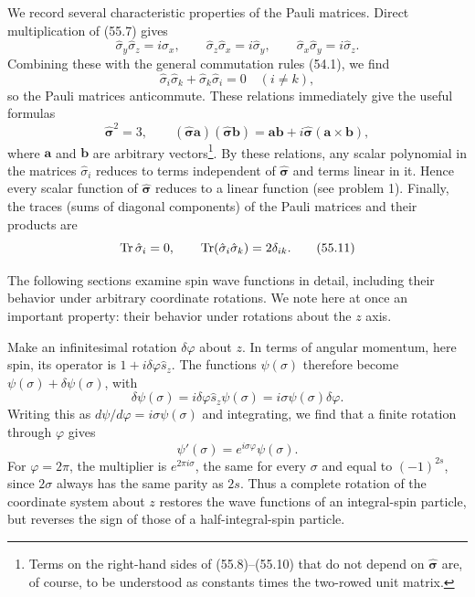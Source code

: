 We record several characteristic properties of the Pauli matrices. Direct
multiplication of (55.7) gives
\begin{equation}
 \hat\sigma_y\hat\sigma_z=i\hat\sigma_x,\qquad
 \hat\sigma_z\hat\sigma_x=i\hat\sigma_y,\qquad
 \hat\sigma_x\hat\sigma_y=i\hat\sigma_z.
 \tag{55.8}
\end{equation}
Combining these with the general commutation rules (54.1), we find
\begin{equation}
 \hat\sigma_i\hat\sigma_k+\hat\sigma_k\hat\sigma_i=0\quad(i\ne k),
 \tag{55.9}
\end{equation}
so the Pauli matrices anticommute. These relations immediately give the useful
formulas
\begin{equation}
 \hat{\boldsymbol\sigma}^{2}=3,\qquad
 (\hat{\boldsymbol\sigma}\mathbf a)
 (\hat{\boldsymbol\sigma}\mathbf b)=
 \mathbf a\mathbf b+i\hat{\boldsymbol\sigma}(\mathbf a\times\mathbf b),
 \tag{55.10}
\end{equation}
where $\mathbf a$ and $\mathbf b$ are arbitrary vectors\footnote{Terms on the
right-hand sides of (55.8)--(55.10) that do not depend on
$\hat{\boldsymbol\sigma}$ are, of course, to be understood as constants
times the two-rowed unit matrix.}. By these relations, any scalar polynomial
in the matrices $\hat\sigma_i$ reduces to terms independent of
$\hat{\boldsymbol\sigma}$ and terms linear in it. Hence every scalar function
of $\hat{\boldsymbol\sigma}$ reduces to a linear function (see problem 1).
Finally, the traces (sums of diagonal components) of the Pauli matrices and
their products are
\begin{equation}
 \operatorname{Tr}\hat\sigma_i=0,\qquad \operatorname{Tr}(\hat\sigma_i\hat\sigma_k)=2\delta_{ik}.
 \tag{55.11}
\end{equation}

The following sections examine spin wave functions in detail, including their
behavior under arbitrary coordinate rotations. We note here at once an
important property: their behavior under rotations about the $z$ axis.

Make an infinitesimal rotation $\delta\varphi$ about $z$. In terms of angular
momentum, here spin, its operator is $1+i\delta\varphi\hat s_z$. The functions
$\psi(\sigma)$ therefore become $\psi(\sigma)+\delta\psi(\sigma)$, with
\[
 \delta\psi(\sigma)=i\delta\varphi\hat s_z\psi(\sigma)
 =i\sigma\psi(\sigma)\delta\varphi.
\]
Writing this as $d\psi/d\varphi=i\sigma\psi(\sigma)$ and integrating, we find
that a finite rotation through $\varphi$ gives
\begin{equation}
 \psi'(\sigma)=e^{i\sigma\varphi}\psi(\sigma).
 \tag{55.12}
\end{equation}
For $\varphi=2\pi$, the multiplier is $e^{2\pi i\sigma}$, the same for every
$\sigma$ and equal to $(-1)^{2s}$, since $2\sigma$ always has the same parity
as $2s$. Thus a complete rotation of the coordinate system about $z$ restores
the wave functions of an integral-spin particle, but reverses the sign of
those of a half-integral-spin particle.

